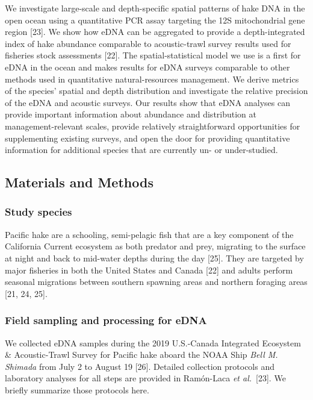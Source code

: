 \documentclass[
]{article}
\begin{document}
We investigate large-scale and depth-specific spatial patterns of hake
DNA in the open ocean using a quantitative PCR assay targeting the 12S
mitochondrial gene region {[}23{]}. We show how eDNA can be aggregated to
provide a depth-integrated index of hake abundance comparable to
acoustic-trawl survey results used for fisheries stock assessments {[}22{]}.
The spatial-statistical model we use is a first for eDNA in the ocean
and makes results for eDNA surveys comparable to other methods used in
quantitative natural-resources management.  We derive metrics of the species' spatial and depth distribution and
investigate the relative precision of the eDNA and acoustic surveys.
Our results show that eDNA analyses can provide important information 
about abundance and distribution at management-relevant scales, provide relatively straightforward
opportunities for supplementing existing surveys, and open the door for
providing quantitative information for additional species that are
currently un- or under-studied. 

\hypertarget{methods}{%
\subsection{Materials and Methods}\label{methods}}

\hypertarget{hake-biology-summary}{%
\subsubsection{Study species}\label{study-species}}

Pacific hake are a schooling, semi-pelagic fish that are a key component
of the California Current ecosystem as both predator and prey, migrating
to the surface at night and back to mid-water depths during the day {[}25{]}. They are targeted by major fisheries in both the United States and
Canada {[}22{]} and adults perform seasonal migrations between southern
spawning areas and northern foraging areas {[}21, 24, 25{]}.

\hypertarget{field-sampling-and-processing-for-edna}{%
\subsubsection{Field sampling and processing for
eDNA}\label{field-sampling-and-processing-for-edna}}

We collected eDNA samples during the 2019 U.S.-Canada Integrated
Ecosystem \& Acoustic-Trawl Survey for Pacific hake aboard the NOAA Ship
\emph{Bell M. Shimada} from July 2 to August 19 {[}26{]}. Detailed
collection protocols and laboratory analyses for all steps are provided
in Ram\'on-Laca \textit{et al.}~{[}23{]}. We briefly summarize those protocols here.
\end{document}
